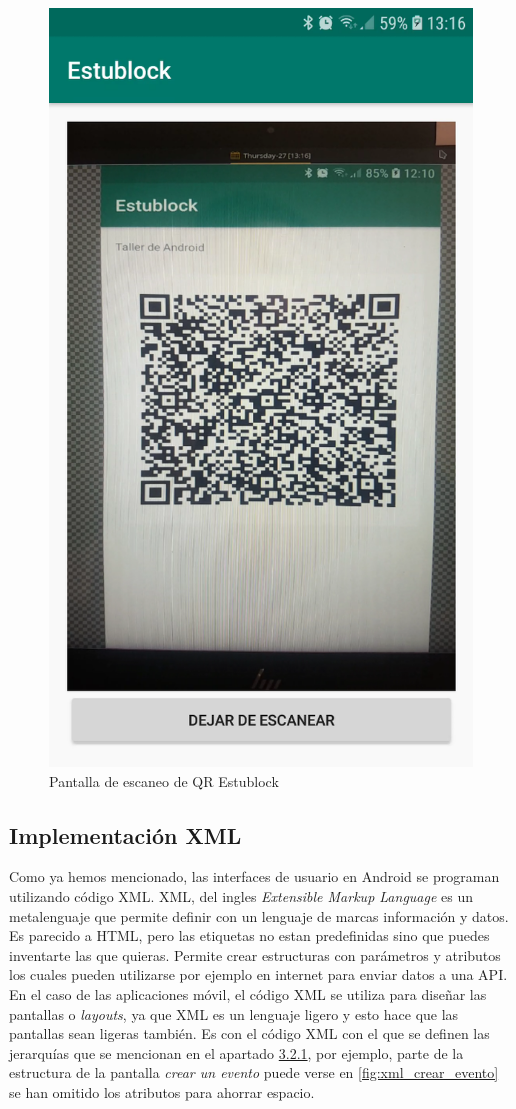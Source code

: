 \begin{figure}[h!]
  \centering
  \includegraphics[width=0.3\linewidth]{figs/Desarrollo/Interfaz/estublock_escanear_qr}
  \caption[Pantalla de Escaneo de QR]{Pantalla de escaneo de QR Estublock}
  \label{fig:pantalla_escaneo_qr}
\end{figure}
\vspace{5cm}
\subsection{Implementación XML}

Como ya hemos mencionado, las interfaces de usuario en Android se programan utilizando código XML. XML, del ingles \emph{Extensible Markup Language} es un metalenguaje que permite definir con un lenguaje de marcas información y datos. Es parecido a HTML, pero las etiquetas no estan predefinidas sino que puedes inventarte las que quieras. Permite crear estructuras con parámetros y atributos los cuales pueden utilizarse por ejemplo en internet para enviar datos a una API. En el caso de las aplicaciones móvil, el código XML se utiliza para diseñar las pantallas o \emph{layouts}, ya que XML es un lenguaje ligero y esto hace que las pantallas sean ligeras también. Es con el código XML con el que se definen las jerarquías que se mencionan en el apartado \hyperref[sec:GUI]{3.2.1}, por ejemplo, parte de la estructura de la pantalla \emph{crear un evento} puede verse en \ref{fig:xml_crear_evento} se han omitido los atributos para ahorrar espacio. \\

